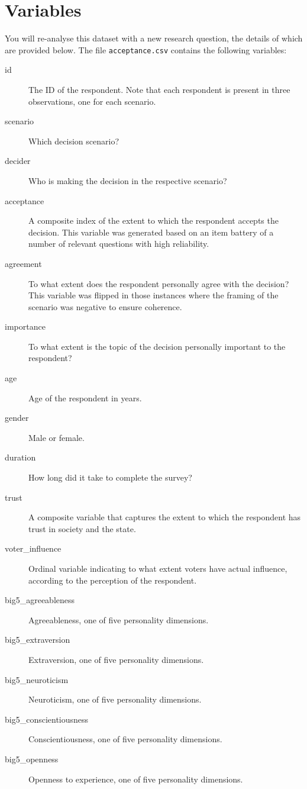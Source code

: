 \documentclass[a4paper,11pt]{article}
\begin{document}
\section*{Variables}
You will re-analyse this dataset with a new research question, the details of which are provided below. The file \texttt{acceptance.csv} contains the following variables:
\begin{description}
 \item[id] The ID of the respondent. Note that each respondent is present in three observations, one for each scenario.
 \item[scenario] Which decision scenario?
 \item[decider] Who is making the decision in the respective scenario?
 \item[acceptance] A composite index of the extent to which the respondent accepts the decision. This variable was generated based on an item battery of a number of relevant questions with high reliability.
 \item[agreement] To what extent does the respondent personally agree with the decision? This variable was flipped in those instances where the framing of the scenario was negative to ensure coherence.
 \item[importance] To what extent is the topic of the decision personally important to the respondent?
 \item[age] Age of the respondent in years.
 \item[gender] Male or female.
 \item[duration] How long did it take to complete the survey?
 \item[trust] A composite variable that captures the extent to which the respondent has trust in society and the state.
 \item[voter\_influence] Ordinal variable indicating to what extent voters have actual influence, according to the perception of the respondent.
 \item[big5\_agreeableness] Agreeableness, one of five personality dimensions.
 \item[big5\_extraversion] Extraversion, one of five personality dimensions.
 \item[big5\_neuroticism] Neuroticism, one of five personality dimensions.
 \item[big5\_conscientiousness] Conscientiousness, one of five personality dimensions.
 \item[big5\_openness] Openness to experience, one of five personality dimensions.

\end{description}
\end{document}
